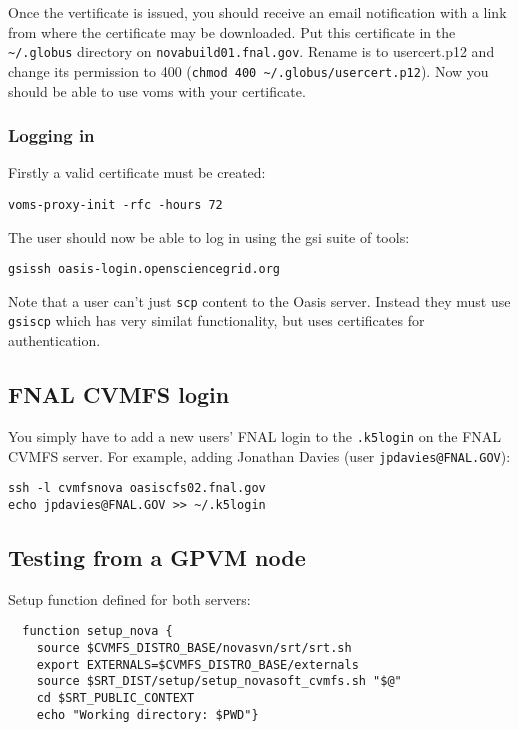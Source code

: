 \documentclass[letterpaper,10pt]{article}
\begin{document}
Once the vertificate is issued, you should receive an email notification with a link from where the certificate may be downloaded. Put this certificate in the \verb|~/.globus| directory on \verb|novabuild01.fnal.gov|. Rename is to usercert.p12 and change its permission to 400 (\verb|chmod 400 ~/.globus/usercert.p12|). Now you should be able to use voms with your certificate.

\subsubsection{Logging in}

Firstly a valid certificate must be created:

\begin{verbatim}
voms-proxy-init -rfc -hours 72
\end{verbatim}


The user should now be able to log in using the gsi suite of tools:
\begin{verbatim}
gsissh oasis-login.opensciencegrid.org
\end{verbatim}

Note that a user can't just \verb|scp| content to the Oasis server. Instead they must use \verb|gsiscp| which has very similat functionality, but uses certificates for authentication.


\subsection{FNAL CVMFS login}
You simply have to add a new users' FNAL login to the \verb|.k5login| on the FNAL CVMFS server. For example, adding Jonathan Davies (user \verb|jpdavies@FNAL.GOV|):
\begin{verbatim}
ssh -l cvmfsnova oasiscfs02.fnal.gov
echo jpdavies@FNAL.GOV >> ~/.k5login
\end{verbatim}



\subsection{Testing from a GPVM node}


Setup function defined for both servers:
\begin{verbatim}
  function setup_nova {
    source $CVMFS_DISTRO_BASE/novasvn/srt/srt.sh
    export EXTERNALS=$CVMFS_DISTRO_BASE/externals
    source $SRT_DIST/setup/setup_novasoft_cvmfs.sh "$@"
    cd $SRT_PUBLIC_CONTEXT
    echo "Working directory: $PWD"}
\end{verbatim}
\end{document}
